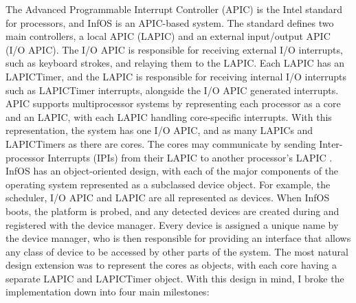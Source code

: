 \documentclass[bsc,frontabs,singlespacing,parskip,deptreport]{infthesis}     %
\begin{document}
The Advanced Programmable Interrupt Controller (APIC) \cite{intel-sys-prog-guide} is the Intel standard for processors, and InfOS is an APIC-based system. The standard defines two main controllers, a local APIC (LAPIC) and an external input/output APIC (I/O APIC). The I/O APIC is responsible for receiving external I/O interrupts, such as keyboard strokes, and relaying them to the LAPIC. Each LAPIC has an LAPICTimer, and the LAPIC is responsible for receiving internal I/O interrupts such as LAPICTimer interrupts, alongside the I/O APIC generated interrupts. APIC supports multiprocessor systems by representing each processor as a core and an LAPIC, with each LAPIC handling core-specific interrupts. With this representation, the system has one I/O APIC, and as many LAPICs and LAPICTimers as there are cores. The cores may communicate by sending Inter-processor Interrupts (IPIs) from their LAPIC to another processor’s LAPIC \cite{intel-sys-prog-guide}. InfOS has an object-oriented design, with each of the major components of the operating system represented as a subclassed device object. For example, the scheduler, I/O APIC and LAPIC are all represented as devices. When InfOS boots, the platform is probed, and any detected devices are created during and registered with the device manager. Every device is assigned a unique name by the device manager, who is then responsible for providing an interface that allows any class of device to be accessed by other parts of the system. The most natural design extension was to represent the cores as objects, with each core having a separate LAPIC and LAPICTimer object. With this design in mind, I broke the implementation down into four main milestones:
\end{document}
